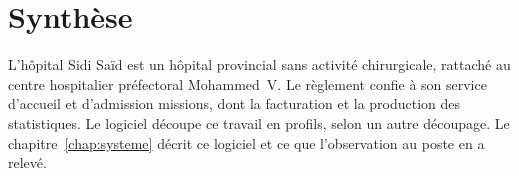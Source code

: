 \section*{Synthèse}

L'hôpital Sidi Saïd est un hôpital provincial sans activité chirurgicale, rattaché au centre
hospitalier préfectoral Mohammed~V. Le règlement confie à son service d'accueil et d'admission
 missions, dont la facturation et la production des statistiques. Le
logiciel découpe ce travail en  profils, selon un autre découpage. Le
chapitre~\ref{chap:systeme} décrit ce logiciel et ce que l'observation au poste en a relevé.
